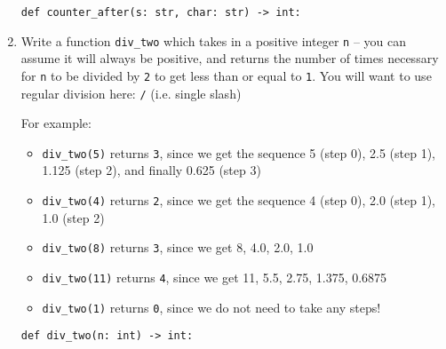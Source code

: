 \documentclass{article}
\begin{document}
\begin{enumerate}
    \vspace{0.2in}

    \verb|def counter_after(s: str, char: str) -> int:|
    \eject

  \item Write a function \verb|div_two| which takes in a positive integer \verb|n| -- you can assume it will always be positive, and returns the number of times necessary for \verb|n| to be divided by \verb|2| to get less than or equal to \verb|1|. You will want to use regular division here: \verb|/|  (i.e. single slash)

For example:
    \begin{itemize}
      \item \verb|div_two(5)| returns \verb|3|, since we get the sequence 5 (step 0), 2.5 (step 1), 1.125 (step 2), and finally 0.625 (step 3)
      \item \verb|div_two(4)| returns \verb|2|, since we get the sequence 4 (step 0), 2.0 (step 1), 1.0 (step 2)
      \item \verb|div_two(8)| returns \verb|3|, since we get 8, 4.0, 2.0, 1.0
      \item \verb|div_two(11)| returns \verb|4|, since we get 11, 5.5, 2.75, 1.375, 0.6875
      \item \verb|div_two(1)| returns \verb|0|, since we do not need to take any steps!
    \end{itemize}

    \vspace{0.2in}


    \verb|def div_two(n: int) -> int:|

\end{enumerate}
\end{document}
